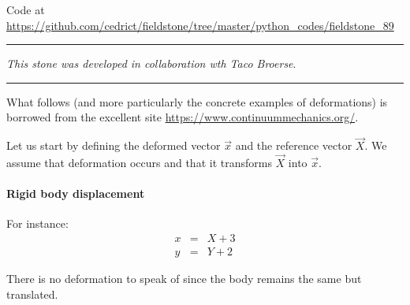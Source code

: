 

\begin{center}
Code at \url{https://github.com/cedrict/fieldstone/tree/master/python_codes/fieldstone_89}
\end{center}

\par\noindent\rule{\textwidth}{0.4pt}

{\sl This stone was developed in collaboration wth Taco Broerse}. 

\par\noindent\rule{\textwidth}{0.4pt}


What follows (and more particularly the concrete examples of deformations) 
is borrowed from the excellent site \url{https://www.continuummechanics.org/}.


Let us start by defining the deformed vector $\vec{x}$ and the reference vector $\vec{X}$.
We assume that deformation occurs and that it transforms $\vec{X}$ into $\vec{x}$.

\paragraph{Rigid body displacement} For instance:  
\begin{eqnarray}
x &=& X + 3 \\
y &=& Y + 2 
\end{eqnarray}


\begin{center}
\end{center}



There is no deformation to speak of since the body remains the same but translated.

